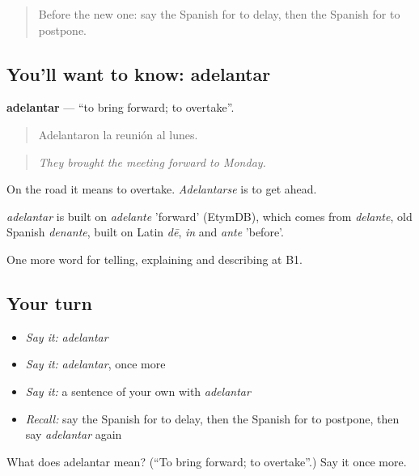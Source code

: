 \begin{quote}
Before the new one: say the Spanish for to delay, then the Spanish for to postpone.
\end{quote}

\subsection*{You'll want to know: adelantar}
\textbf{adelantar} — \textquotedblleft{}to bring forward; to overtake\textquotedblright{}.

\begin{quote}
Adelantaron la reunión al lunes.
\end{quote}

\begin{quote}
\emph{They brought the meeting forward to Monday.}
\end{quote}

On the road it means to overtake. \emph{Adelantarse} is to get ahead.

\begin{cousinweb}
\emph{adelantar} is built on \emph{adelante} 'forward' (EtymDB), which comes from \emph{delante}, old Spanish \emph{denante}, built on Latin \emph{dē}, \emph{in} and \emph{ante} 'before'.
\end{cousinweb}

\begin{grammarlens}[title={What you've built}]
One more word for telling, explaining and describing at B1.
\end{grammarlens}

\subsection*{Your turn}
\begin{itemize}
\raggedright
  \item \emph{Say it:} \emph{adelantar}
  \item \emph{Say it:} \emph{adelantar}, once more
  \item \emph{Say it:} a sentence of your own with \emph{adelantar}
  \item \emph{Recall:} say the Spanish for to delay, then the Spanish for to postpone, then say \emph{adelantar} again
\end{itemize}

\begin{tcolorbox}[breakable,colback=teal!4,colframe=teal!35!black,title={Before you move on}]
What does adelantar mean? (\textquotedblleft{}To bring forward; to overtake\textquotedblright{}.) Say it once more.
\end{tcolorbox}
